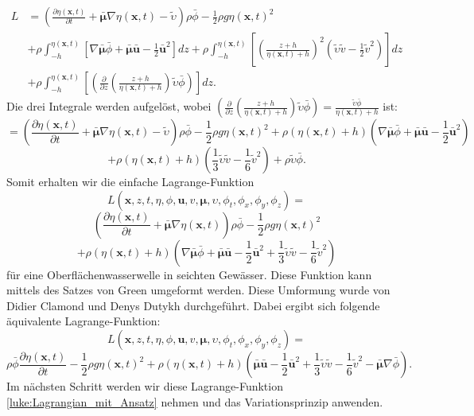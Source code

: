 \begin{align*}
	L&=
	\left(\frac{\partial \eta(\bm{x}, t)}{\partial t}
	+
	\bar{\bm{\mu}}  \nabla \eta(\bm{x}, t)
	-
	\widetilde{\upsilon}\right)\rho \bar{\phi}
	-
	\frac{1}{2}\rho g \eta(\bm{x}, t)^2
	\\
	&+
	\rho\int_{-h}^{\eta(\bm{x}, t)} \left[ \nabla \bar{\bm{\mu}}\bar{\phi} + \bar{\bm{\mu}}\bar{\bm{u}} - \frac{1}{2} \bar{\bm{u}}^2\right] dz
	+
	\rho\int_{-h}^{\eta(\bm{x}, t)} \left[ \left(\frac{z + h}{\eta(\bm{x}, t) + h}\right)^2 \left(\tilde{\upsilon}\tilde{v} - \frac{1}{2} \tilde{v}^2\right)\right] dz
	\\
	&+
	\rho\int_{-h}^{\eta(\bm{x}, t)} \left[ \left(\frac{\partial}{\partial z} \left(\frac{z + h}{\eta(\bm{x}, t) + h}\right)\tilde{\upsilon} \bar{\phi} \right)\right] dz.
\end{align*}
Die drei Integrale werden aufgelöst, wobei $\left(\frac{\partial}{\partial z} \left(\frac{z + h}{\eta(\bm{x}, t) + h}\right)\tilde{\upsilon} \bar{\phi} \right) = \frac{\tilde{\upsilon} \bar{\phi}}{\eta(\bm{x}, t) + h}$ ist:
\[
=
\left(\frac{\partial \eta(\bm{x}, t)}{\partial t}
+
\bar{\bm{\mu}} \nabla \eta(\bm{x}, t)
-
\widetilde{\upsilon}\right)\rho \bar{\phi}
-
\frac{1}{2}\rho g \eta(\bm{x}, t)^2
+
\rho(\eta(\bm{x}, t) + h) \left(\nabla \bar{\bm{\mu}}\bar{\phi} + \bar{\bm{\mu}}\bar{\bm{u}} - \frac{1}{2} \bar{\bm{u}}^2\right)
\]
\[
+
\rho(\eta(\bm{x}, t) + h) \left(\frac{1}{3}\tilde{\upsilon}\tilde{v} - \frac{1}{6}\tilde{v}^2 \right)
+
\rho\tilde{\upsilon} \bar{\phi}.
\]
Somit erhalten wir die einfache Lagrange-Funktion
\[
L(\bm{x},z,t,\eta,\phi,\bm{u}, v, \bm{\mu},\upsilon,\phi_t,\phi_x,\phi_y,\phi_z)
=
\]
\[
\left(\frac{\partial \eta(\bm{x}, t)}{\partial t}
+
\bar{\bm{\mu}} \nabla \eta(\bm{x}, t) \right)\rho \bar{\phi}
-
\frac{1}{2}\rho g \eta(\bm{x}, t)^2
\]
\[
+
\rho(\eta(\bm{x}, t) + h) \left(\nabla \bar{\bm{\mu}}\bar{\phi} + \bar{\bm{\mu}}\bar{\bm{u}} - \frac{1}{2} \bar{\bm{u}}^2 + \frac{1}{3} \tilde{\upsilon}\tilde{v} - \frac{1}{6}\tilde{v}^2\right)
\]
für eine Oberflächenwasserwelle in seichten Gewässer.
Diese Funktion kann mittels des Satzes von Green umgeformt werden.
Diese Umformung wurde von Didier Clamond und Denys Dutykh \cite{luke:CLAMOND201225} durchgeführt.
Dabei ergibt sich folgende äquivalente Lagrange-Funktion:
\[
L(\bm{x},z,t,\eta,\phi,\bm{u}, v, \bm{\mu},\upsilon,\phi_t,\phi_x,\phi_y,\phi_z)
=
\]
\begin{equation}
	\rho\bar{\phi}\frac{\partial \eta(\bm{x}, t)}{\partial t}
	-
	\frac{1}{2} \rho g \eta(\bm{x}, t)^2
	+
	\rho(\eta(\bm{x}, t) + h)
	\left(
	\bar{\bm{\mu}}\bar{\bm{u}}
	-
	\frac{1}{2} \bar{\bm{u}}^2 
	+
	\frac{1}{3} \tilde{\upsilon}\tilde{v}
	-
	\frac{1}{6}\tilde{v}^2
	-
	\bar{\bm{\mu}}\nabla \bar{\phi}
	\right).
	\label{luke:Lagrangian_mit_Ansatz}
\end{equation}
Im nächsten Schritt werden wir diese Lagrange-Funktion \eqref{luke:Lagrangian_mit_Ansatz} nehmen und das Variationsprinzip anwenden.

